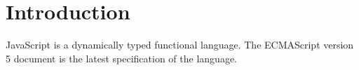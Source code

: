 \section{Introduction}

JavaScript is a dynamically typed functional language.
The ECMAScript version 5 document \cite{ECMAScript09}
is the latest specification of the language.
